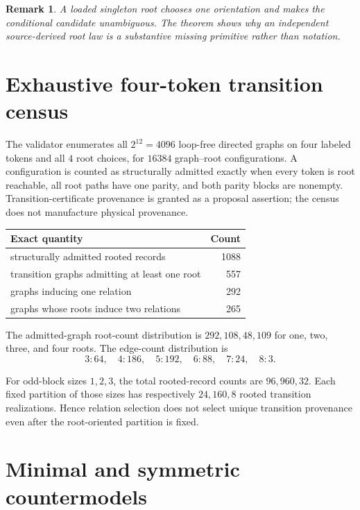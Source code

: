 \documentclass[11pt]{article}
\newtheorem{remark}{Remark}
\begin{document}
\begin{remark}
A loaded singleton root chooses one orientation and makes the conditional
candidate unambiguous. The theorem shows why an independent source-derived
root law is a substantive missing primitive rather than notation.
\end{remark}

\section{Exhaustive four-token transition census}

The validator enumerates all \(2^{12}=4096\) loop-free directed graphs on four
labeled tokens and all \(4\) root choices, for \(16384\) graph--root
configurations. A configuration is counted as structurally admitted exactly
when every token is root reachable, all root paths have one parity, and both
parity blocks are nonempty. Transition-certificate provenance is granted as a
proposal assertion; the census does not manufacture physical provenance.

\begin{center}
\begin{tabular}{lr}
\toprule
Exact quantity & Count \\
\midrule
structurally admitted rooted records & 1088 \\
transition graphs admitting at least one root & 557 \\
graphs inducing one relation & 292 \\
graphs whose roots induce two relations & 265 \\
\bottomrule
\end{tabular}
\end{center}

The admitted-graph root-count distribution is \(292,108,48,109\) for one,
two, three, and four roots. The edge-count distribution is
\[
3{:}64,\quad 4{:}186,\quad 5{:}192,\quad 6{:}88,\quad
7{:}24,\quad 8{:}3.
\]

For odd-block sizes \(1,2,3\), the total rooted-record counts are
\(96,960,32\). Each fixed partition of those sizes has respectively
\(24,160,8\) rooted transition realizations. Hence relation selection does not
select unique transition provenance even after the root-oriented partition is
fixed.

\section{Minimal and symmetric countermodels}
\end{document}
